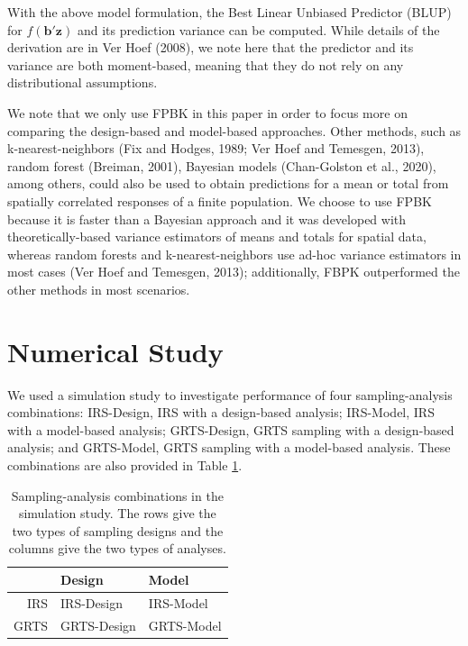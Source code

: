 \documentclass[]{elsarticle} %
\begin{document}
With the above model formulation, the Best Linear Unbiased Predictor
(BLUP) for \(f(\mathbf{b}'\mathbf{z})\) and its prediction variance can
be computed. While details of the derivation are in Ver Hoef (2008), we
note here that the predictor and its variance are both moment-based,
meaning that they do not rely on any distributional assumptions.

We note that we only use FPBK in this paper in order to focus more on
comparing the design-based and model-based approaches. Other methods,
such as k-nearest-neighbors (Fix and Hodges, 1989; Ver Hoef and
Temesgen, 2013), random forest (Breiman, 2001), Bayesian models
(Chan-Golston et al., 2020), among others, could also be used to obtain
predictions for a mean or total from spatially correlated responses of a
finite population. We choose to use FPBK because it is faster than a
Bayesian approach and it was developed with theoretically-based variance
estimators of means and totals for spatial data, whereas random forests
and k-nearest-neighbors use ad-hoc variance estimators in most cases
(Ver Hoef and Temesgen, 2013); additionally, FBPK outperformed the other
methods in most scenarios.

\hypertarget{sec:numstudy}{%
\section{Numerical Study}\label{sec:numstudy}}

We used a simulation study to investigate performance of four
sampling-analysis combinations: IRS-Design, IRS with a design-based
analysis; IRS-Model, IRS with a model-based analysis; GRTS-Design, GRTS
sampling with a design-based analysis; and GRTS-Model, GRTS sampling
with a model-based analysis. These combinations are also provided in
Table \ref{tab:designanalysis}.

\begin{table}[ht]
\centering
\begin{tabular}{r|ll}
  \hline
 & Design & Model \\ 
  \hline
IRS & IRS-Design & IRS-Model \\ 
  GRTS & GRTS-Design & GRTS-Model \\ 
   \hline
\end{tabular}
\caption{\label{tab:designanalysis} Sampling-analysis combinations in the simulation study. The rows give the two types of sampling designs and the columns give the two types of analyses.} 
\end{table}
\end{document}
